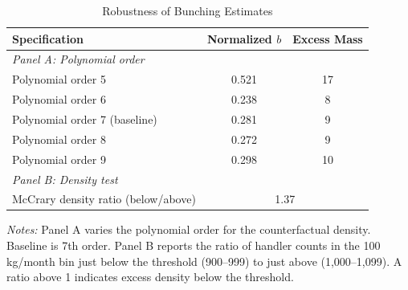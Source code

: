 
\begin{table}[H]
\centering
\caption{Robustness of Bunching Estimates}
\begin{threeparttable}
\begin{tabular}{lcc}
\toprule
Specification & Normalized $b$ & Excess Mass \\
\midrule
\textit{Panel A: Polynomial order} & & \\
Polynomial order 5 & 0.521 & 17 \\
Polynomial order 6 & 0.238 & 8 \\
Polynomial order 7 (baseline) & 0.281 & 9 \\
Polynomial order 8 & 0.272 & 9 \\
Polynomial order 9 & 0.298 & 10 \\
\midrule
\textit{Panel B: Density test} & & \\
McCrary density ratio (below/above) & \multicolumn{2}{c}{1.37} \\
\bottomrule
\end{tabular}
\begin{tablenotes}[flushleft]
\small
\item \textit{Notes:} Panel A varies the polynomial order for the counterfactual density. Baseline is 7th order. Panel B reports the ratio of handler counts in the 100 kg/month bin just below the threshold (900--999) to just above (1,000--1,099). A ratio above 1 indicates excess density below the threshold.
\end{tablenotes}
\end{threeparttable}
\label{tab:robustness}
\end{table}
